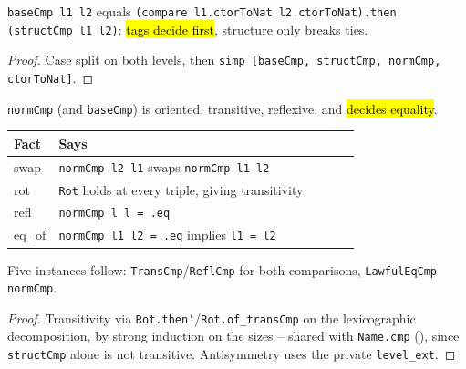 \begin{lemma}
\label{thm:normlt-basecmp-eq}
\leanok
{}

 \texttt{baseCmp l1 l2} equals \texttt{(compare l1.ctorToNat l2.ctorToNat).then
(structCmp l1 l2)}: \hl{tags decide first}, structure only breaks ties.
\end{lemma}
\begin{proof}
\leanok
{} Case split on both levels, then \texttt{simp [baseCmp, structCmp, normCmp, ctorToNat]}.
\end{proof}

\begin{lemma}
\label{fam:normlt-order-instances}
\leanok
{}
 \texttt{normCmp} (and \texttt{baseCmp}) is oriented, transitive, reflexive, and
\hl{decides equality}.
\begin{center}
\begin{tabular}{lp{0.87\linewidth}}
\toprule
Fact & Says \\
\midrule
swap & \texttt{normCmp l2 l1} swaps \texttt{normCmp l1 l2} \\
rot & \texttt{Rot} holds at every triple, giving transitivity \\
refl & \texttt{normCmp l l = .eq} \\
eq\_of & \texttt{normCmp l1 l2 = .eq} implies \texttt{l1 = l2} \\
\bottomrule
\end{tabular}\par\smallskip
\end{center}
Five instances follow: \texttt{TransCmp}/\texttt{ReflCmp} for both comparisons, \texttt{LawfulEqCmp
normCmp}.
\end{lemma}
\begin{proof}
\leanok
{} Transitivity via \texttt{Rot.then'}/\texttt{Rot.of\_transCmp} on the lexicographic
decomposition, by strong induction on the sizes -- shared with \texttt{Name.cmp}
(), since \texttt{structCmp} alone is not transitive. Antisymmetry
uses the private \texttt{level\_ext}.
\end{proof}

